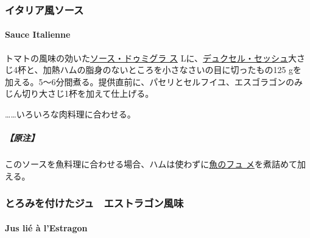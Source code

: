 \begin{recette}
\maeaki

\hypertarget{ux30a4ux30bfux30eaux30a2ux98a8ux30bdux30fcux30b9}{%
\subsubsection{イタリア風ソース}\label{ux30a4ux30bfux30eaux30a2ux98a8ux30bdux30fcux30b9}}

\hypertarget{sauce-italienne}{%
\paragraph{Sauce Italienne}\label{sauce-italienne}}


トマトの風味の効いた\protect\hyperlink{sauce-demi-glace}{ソース・ドゥミグラ
ス}\troisquarts{} Lに、\protect\hyperlink{}{デュクセル・セッシュ}大さ
じ4杯と、加熱ハムの脂身のないところを小さなさいの目に切ったもの125 gを
加える。5〜6分間煮る。提供直前に、パセリとセルフイユ、エスゴラゴンのみ
じん切り大さじ1杯を加えて仕上げる。

\ldots{}\ldots{}いろいろな肉料理に合わせる。

\hypertarget{ux539fux6ce8-4}{%
\subparagraph{【原注】}\label{ux539fux6ce8-4}}

このソースを魚料理に合わせる場合、ハムは使わずに\protect\hyperlink{fumet-de-poisson}{魚のフュ
メ}を煮詰めて加える。

\maeaki

\hypertarget{ux3068ux308dux307fux3092ux4ed8ux3051ux305fux30b8ux30e5ux30a8ux30b9ux30c8ux30e9ux30b4ux30f3ux98a8ux5473}{%
\subsubsection{とろみを付けたジュ　エストラゴン風味}\label{ux3068ux308dux307fux3092ux4ed8ux3051ux305fux30b8ux30e5ux30a8ux30b9ux30c8ux30e9ux30b4ux30f3ux98a8ux5473}}

\hypertarget{jus-lie-a-lestragon}{%
\paragraph{Jus lié à l'Estragon}\label{jus-lie-a-lestragon}}


\end{recette}
